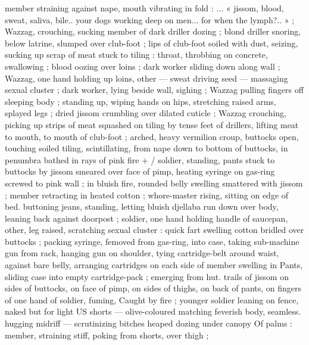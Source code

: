 member straining against nape, mouth vibrating in fold : ... « jissom,
blood, sweat, saliva, bile.. your dogs working deep on men... for
when the lymph?.. » ; Wazzag, crouching, sucking member of dark
driller dozing ; blond driller snoring, below latrine, slumped over
club-foot ; lips of club-foot soiled with dust, seizing, sucking up
scrap of meat stuck to tiling : throat, throbbing on concrete,
swallowing ; blood oozing over loins ; dark worker sliding down along
wall ; Wazzag, one hand holding up loins, other — sweat driving
seed — massaging sexual cluster ; dark worker, lying beside wall,
sighing ; Wazzag pulling fingers off sleeping body ; standing up,
wiping hands on hips, stretching raised arms, splayed legs ; dried
jissom crumbling over dilated cuticle ; Wazzag crouching, picking up
strips of meat squashed on tiling by tense feet of drillers, lifting
meat to mouth, to mouth of club-foot ; arched, heavy vermilion
croup, buttocks open, touching soiled tiling, scintillating, from nape
down to bottom of buttocks, in penumbra bathed in rays of pink fire
+ / soldier, standing, pants stuck to buttocks by jissom smeared over
face of pimp, heating syringe on gas-ring screwed to pink wall ; in
bluish fire, rounded belly swelling smattered with jissom ; member
retracting in heated cotton ; whore-master rising, sitting on edge of
bed. buttoning jeans, standing, letting bluish djellaba run down over
body, leaning back against doorpost ; soldier, one hand holding
handle of saucepan, other, leg raised, scratching sexual cluster :
quick fart swelling cotton bridled over buttocks ; packing syringe,
femoved from gas-ring, into case, taking sub-machine gun from rack,
hanging gun on shoulder, tying cartridge-belt around waist, against
bare belly, arranging cartridges on each side of member swelling in
Pants, sliding case into empty cartridge-pack ; emerging from hut.
trails of jissom on sides of buttocks, on face of pimp, on sides of
thighs, on back of pants, on fingers of one hand of soldier, fuming,
Caught by fire ; younger soldier leaning on fence, naked but for light
US shorts — olive-coloured matching feverish body, seamless.
hugging midriff — scrutinizing bitches heaped dozing under canopy
Of palms : member, straining stiff, poking from shorts, over thigh ;

